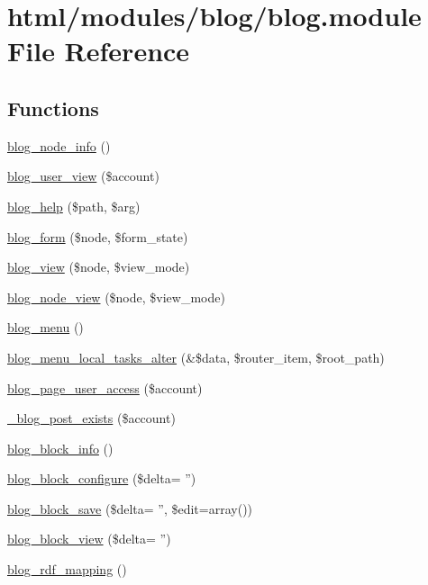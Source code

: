 \hypertarget{blog_8module}{
\section{html/modules/blog/blog.module File Reference}
\label{blog_8module}
}
\subsection*{Functions}
\begin{DoxyCompactItemize}
\item 
\hyperlink{blog_8module_a507d5bb1a9160b40f638c8a9185d5a7d}{blog\_\-node\_\-info} ()
\item 
\hyperlink{blog_8module_a12331d194dce2c5dfe857ca337ce14fe}{blog\_\-user\_\-view} (\$account)
\item 
\hyperlink{blog_8module_a02fba16f89137e0e37363aa52e48efcc}{blog\_\-help} (\$path, \$arg)
\item 
\hyperlink{blog_8module_aad8f1eac6b5325e01d681706f8786af4}{blog\_\-form} (\$node, \$form\_\-state)
\item 
\hyperlink{blog_8module_a4c2d452795896133f48078e93f06260d}{blog\_\-view} (\$node, \$view\_\-mode)
\item 
\hyperlink{blog_8module_aef07831d7585949a6c1fffae85571598}{blog\_\-node\_\-view} (\$node, \$view\_\-mode)
\item 
\hyperlink{blog_8module_aa58934e91c0c815986a6810d9ba15d26}{blog\_\-menu} ()
\item 
\hyperlink{blog_8module_a333ae4f21d19d83ebf67eb1ebe327cac}{blog\_\-menu\_\-local\_\-tasks\_\-alter} (\&\$data, \$router\_\-item, \$root\_\-path)
\item 
\hyperlink{blog_8module_a213af875712242031b407a11e973e1db}{blog\_\-page\_\-user\_\-access} (\$account)
\item 
\hyperlink{blog_8module_a7603ad9be5af15eb4a46dec8a4156cf3}{\_\-blog\_\-post\_\-exists} (\$account)
\item 
\hyperlink{blog_8module_a195ee731f64b9c90d54d57ba9a3c3616}{blog\_\-block\_\-info} ()
\item 
\hyperlink{blog_8module_ad5210eabd038ec5b68563d6501125c6e}{blog\_\-block\_\-configure} (\$delta= '')
\item 
\hyperlink{blog_8module_a7d6feb86f9fde964654130e26769181b}{blog\_\-block\_\-save} (\$delta= '', \$edit=array())
\item 
\hyperlink{blog_8module_a78b74d77d05f2ee6f6bf61d83909f7b6}{blog\_\-block\_\-view} (\$delta= '')
\item 
\hyperlink{blog_8module_a8917f4ec69b9f23320607e0f3310f1db}{blog\_\-rdf\_\-mapping} ()
\end{DoxyCompactItemize}


